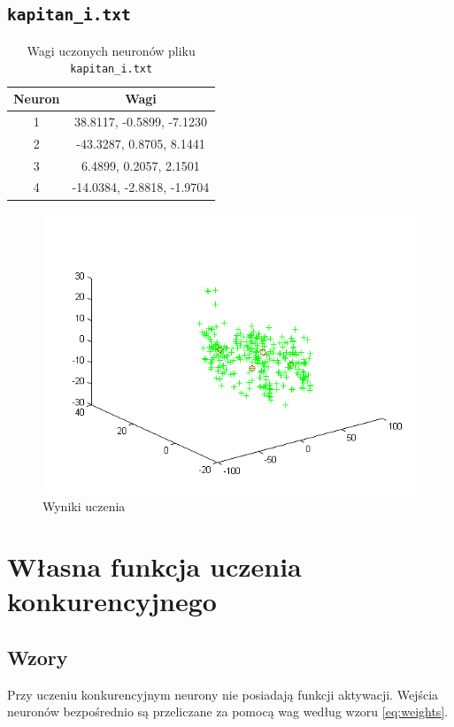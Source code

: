 \documentclass[pointlessnumbers, abstracton, headsepline, a4paper]{scrartcl}
\begin{document}
\clearpage
\subsection{\texttt{kapitan\_i.txt}}

\begin{table}[h]
\centering
\begin{tabular}[t]{c|c}
Neuron & Wagi \\
\hline
1& 38.8117,  -0.5899,  -7.1230 \\
2&-43.3287,   0.8705,   8.1441 \\
3&  6.4899,   0.2057,   2.1501 \\
4&-14.0384,  -2.8818,  -1.9704 \\
\end{tabular}
\caption{\label{tab:xor}Wagi uczonych neuronów pliku \texttt{kapitan\_i.txt}}
\end{table}

\begin{figure}[!h]
\centering
\includegraphics[scale=0.8]{src/kapitan_i.png}\caption{\label{fig:dane1}Wyniki uczenia}
\end{figure}

\clearpage
\section{Własna funkcja uczenia konkurencyjnego}
\subsection{Wzory}

Przy uczeniu konkurencyjnym neurony nie posiadają funkcji aktywacji. Wejścia neuronów bezpośrednio są przeliczane za pomocą wag według wzoru \ref{eq:weights}.
\end{document}
